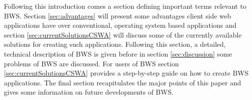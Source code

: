 Following this introduction comes a section defining important terms relevant to BWS. Section \ref{sec:advantages} will present some advantages client side web applications have over conventional, operating system based applications and section \ref{sec:currentSolutionsCSWA} will discuss some of the currently available solutions for creating such applications. Following this section, a detailed, technical description of BWS is given before in section \ref{sec:discussion} some problems of BWS are discussed. For users of BWS section \ref{sec:currentSolutionsCSWA} provides a step-by-step guide on how to create BWS applications. The final section recapitulates the major points of this paper and gives some information on future developments of BWS.